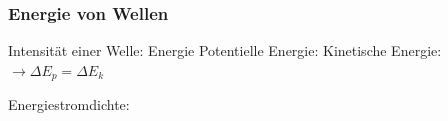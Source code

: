     \subsubsection{Energie von Wellen}

    Intensität einer Welle: Energie
    Potentielle Energie:
    Kinetische Energie:
    $\rightarrow \Delta E_p = \Delta E_k$  

    Energiestromdichte:
